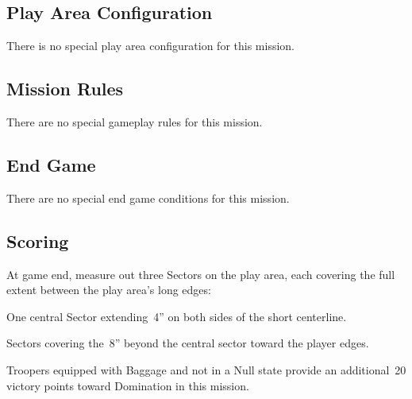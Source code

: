 \label{mission:frontline}

\subsection{Play Area Configuration}

There is no special play area configuration for this mission.

\subsection{Mission Rules}

There are no special gameplay rules for this mission.

\subsection{End Game}

There are no special end game conditions for this mission.

\subsection{Scoring}


  At game end, measure out three Sectors on the
play area, each covering the full extent between the play area's long
edges:

\begin{squishitemize}
\item One central Sector extending~4'' on both sides of the short
  centerline.
\item Sectors covering the~8'' beyond the central sector toward the
  player edges.
\end{squishitemize}

 Troopers equipped with Baggage and
not in a Null state provide an additional~20 victory points toward
Domination in this mission.


